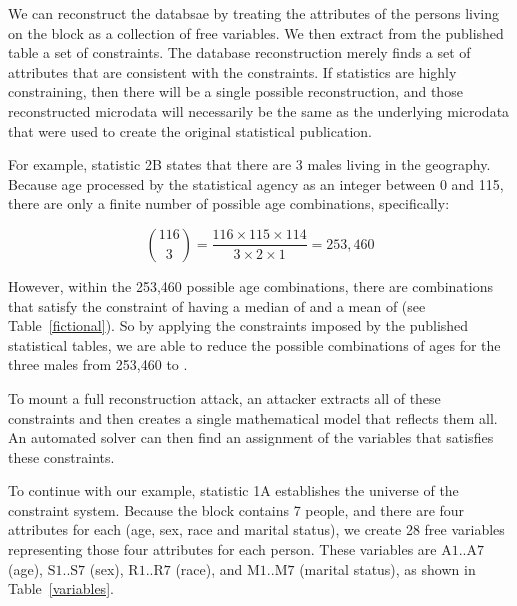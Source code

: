 \documentclass[runningheads]{llncs}
\begin{document}
We can reconstruct the databsae by treating the attributes
of the persons living on the block as a collection of 
free variables. We then extract from the published table a set of
constraints. The database reconstruction merely finds a set of
attributes that are consistent with the constraints. If statistics are
highly constraining, then there will be a single possible
reconstruction, and those reconstructed microdata will necessarily be the same as the underlying
microdata that were used to create the original statistical publication.

For example, statistic 2B states that there are 3 males living in the
geography.  Because age processed by the statistical agency as an integer between 0 and 115, there
are only a finite number of possible age combinations, specifically:

\[ \binom{116}{3}=\frac{116 \times 115 \times 114}{3 \times 2 \times
  1} = 253,460 \]


However, within the 253,460 possible age combinations, there are \mycount{} combinations that satisfy the
constraint of having a median of \mymedian{} and a mean of \mymean{}
(see Table~\ref{fictional}). So by applying the constraints imposed by the
published statistical tables, we are able to reduce the possible
combinations of ages for the three males from 253,460 to \mycount.

To mount a full reconstruction attack, an attacker extracts all of these
constraints and then creates a
single mathematical model that reflects them all. An automated solver can then
find an assignment of the variables that satisfies these constraints. 

To continue with our example, statistic 1A establishes the universe of
the constraint system. Because the block contains 7 people, and there
are four attributes for each (age, sex, race and marital status), we
create 28 free variables representing those four attributes for each
person. These variables are $\textrm{A}1..\textrm{A}7$ (age),
$\textrm{S}1..\textrm{S}7$ (sex), $\textrm{R}1..\textrm{R}7$ (race),
and $\textrm{M}1..\textrm{M}7$ (marital status), as shown in
Table~\ref{variables}.
\end{document}
